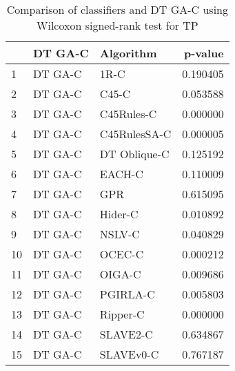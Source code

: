 \begin{table}
\footnotesize
\caption{Comparison of classifiers and DT GA-C using Wilcoxon signed-rank test for TP}
\label{tab:DT GA-C wilcoxon TP comparison}
\begin{tabular}{lllr}
\hline
 & DT GA-C & Algorithm & p-value \\
\hline
1 & DT GA-C & 1R-C & 0.190405 \\
2 & DT GA-C & C45-C & 0.053588 \\
3 & DT GA-C & C45Rules-C & 0.000000 \\
4 & DT GA-C & C45RulesSA-C & 0.000005 \\
5 & DT GA-C & DT Oblique-C & 0.125192 \\
6 & DT GA-C & EACH-C & 0.110009 \\
7 & DT GA-C & GPR & 0.615095 \\
8 & DT GA-C & Hider-C & 0.010892 \\
9 & DT GA-C & NSLV-C & 0.040829 \\
10 & DT GA-C & OCEC-C & 0.000212 \\
11 & DT GA-C & OIGA-C & 0.009686 \\
12 & DT GA-C & PGIRLA-C & 0.005803 \\
13 & DT GA-C & Ripper-C & 0.000000 \\
14 & DT GA-C & SLAVE2-C & 0.634867 \\
15 & DT GA-C & SLAVEv0-C & 0.767187 \\
\hline
\end{tabular}
\end{table}
